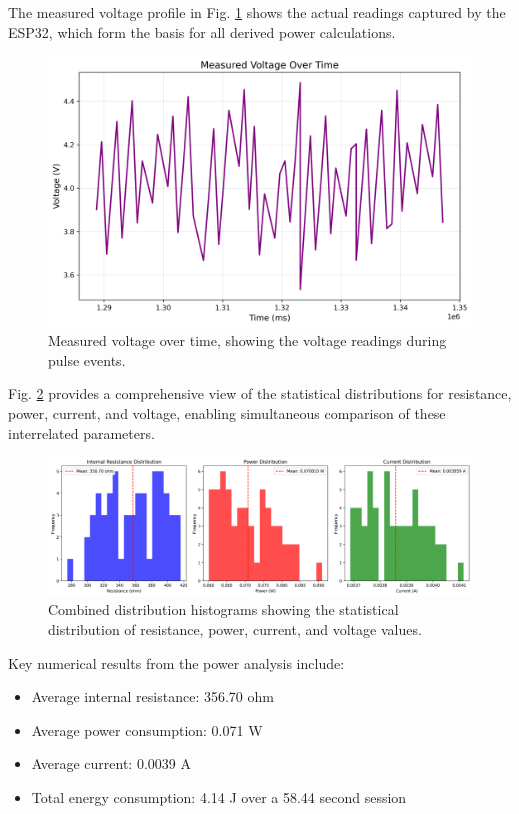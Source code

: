 \documentclass[conference]{IEEEtran}
\begin{document}
The measured voltage profile in Fig. \ref{fig:power_voltage} shows the actual readings captured by the ESP32, which form the basis for all derived power calculations.

\begin{figure}[htbp]
    \centering
    \includegraphics[width=\linewidth]{data/power_session_2025-05-09_1440/plots/power_voltage.png}
    \caption{Measured voltage over time, showing the voltage readings during pulse events.}
    \label{fig:power_voltage}
\end{figure}

Fig. \ref{fig:power_distributions} provides a comprehensive view of the statistical distributions for resistance, power, current, and voltage, enabling simultaneous comparison of these interrelated parameters.

\begin{figure}[htbp]
    \centering
    \includegraphics[width=\linewidth]{data/power_session_2025-05-09_1440/plots/power_distributions.png}
    \caption{Combined distribution histograms showing the statistical distribution of resistance, power, current, and voltage values.}
    \label{fig:power_distributions}
\end{figure}

Key numerical results from the power analysis include:
\begin{itemize}
    \item Average internal resistance: 356.70 ohm
    \item Average power consumption: 0.071 W
    \item Average current: 0.0039 A
    \item Total energy consumption: 4.14 J over a 58.44 second session
\end{itemize}
\end{document}
